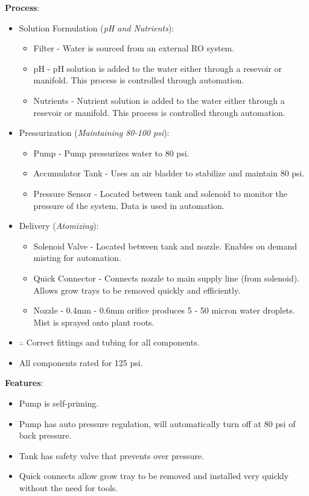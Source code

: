 \documentclass{report}
\begin{document}
\textbf{Process}:
\begin{itemize}
    \item Solution Formulation (\textit{pH and Nutrients}):
    \begin{itemize}
        \item Filter - Water is sourced from an external RO system.
        \item pH - pH solution is added to the water either through a resevoir or manifold. This process is controlled through automation.
        \item Nutrients - Nutrient solution is added to the water either through a resevoir or manifold. This process is controlled through automation.
    \end{itemize}
    \item Pressurization (\textit{Maintaining 80-100 psi}):
    \begin{itemize}
        \item Pump - Pump pressurizes water to 80 psi.
        \item Accumulator Tank - Uses an air bladder to stabilize and maintain 80 psi.
        \item Pressure Sensor - Located between tank and solenoid to monitor the pressure of the system. Data is used in automation.
    \end{itemize}
    \item Delivery (\textit{Atomizing}):
    \begin{itemize}
        \item Solenoid Valve - Located between tank and nozzle. Enables on demand misting for automation.
        \item Quick Connector - Connects nozzle to main supply line (from solenoid). Allows grow trays to be removed quickly and efficiently. 
        \item Nozzle - 0.4mm - 0.6mm orifice produces 5 - 50 micron water droplets. Mist is sprayed onto plant roots. 
    \end{itemize}

    \item $\therefore$ Correct fittings and tubing for all components.
    \item All components rated for 125 psi.
\end{itemize}

\textbf{Features}:
\begin{itemize}
    \item Pump is self-priming.
    \item Pump has auto pressure regulation, will automatically turn off at 80 psi of back pressure.
    \item Tank has safety valve that prevents over pressure.
    \item Quick connects allow grow tray to be removed and installed very quickly without the need for tools.
\end{itemize}
\end{document}

